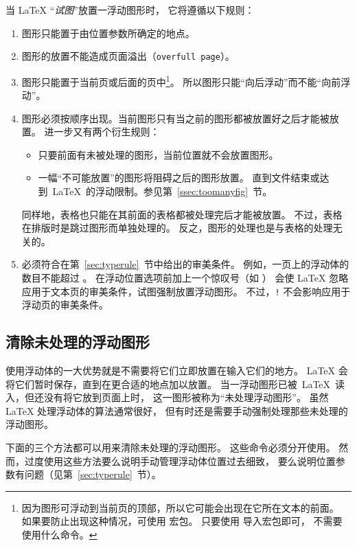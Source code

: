 当 \LaTeX{} “\emph{试图}”放置一浮动图形时，
它将遵循以下规则：
\begin{enumerate}
	\item 图形只能置于由位置参数所确定的地点。
	\item 图形的放置不能造成页面溢出（\texttt{overfull page}）。
	\item 图形只能置于当前页或后面的页中\footnote{
        因为图形可浮动到当前页的顶部，所以它可能会出现在它所在文本的前面。
		如果要防止出现这种情况，可使用 宏包。
		只要使用  导入宏包即可，
		不需要使用什么命令。}。
	所以图形只能“向后浮动”而不能“向前浮动”。
	\item 图形必须按顺序出现。当前图形只有当之前的图形都被放置好之后才能被放置。
	进一步又有两个衍生规则：
	\begin{itemize}
		\item 只要前面有未被处理的图形，当前位置就不会放置图形。
		\item 一幅“不可能放置”的图形将阻碍之后的图形放置。
		直到文件结束或达到~\LaTeX{}~的浮动限制。参见第~\ref{ssec:toomanyfig}~节。
	\end{itemize}
	同样地，表格也只能在其前面的表格都被处理完后才能被放置。
	不过，表格在排版时是跳过图形而单独处理的。
	反之，图形的处理也是与表格的处理无关的。
	\item 必须符合在第~\ref{sec:typerule}~节中给出的审美条件。
	例如，一页上的浮动体的数目不能超过 。
	在浮动位置选项前加上一个惊叹号（如 \opt{[!ht]}）
	会使 \LaTeX{} 忽略应用于文本页的审美条件，试图强制放置浮动图形。
	不过，\texttt{!} 不会影响应用于浮动页的审美条件。
\end{enumerate}


\subsection{清除未处理的浮动图形}\label{ssec:unprocessfig}

使用浮动体的一大优势就是不需要将它们立即放置在输入它们的地方。
\LaTeX{} 会将它们暂时保存，直到在更合适的地点加以放置。
当一浮动图形已被~\LaTeX{}~读入，但还没有将它放到页面上时，
这一图形被称为“未处理浮动图形”。
虽然 \LaTeX{} 处理浮动体的算法通常很好，
但有时还是需要手动强制处理那些未处理的浮动图形。

下面的三个方法都可以用来清除未处理的浮动图形。
这些命令必须分开使用。
然而，过度使用这些方法要么说明手动管理浮动体位置过去细致，
要么说明位置参数有问题（见第~\ref{sec:typerule}~节）。

